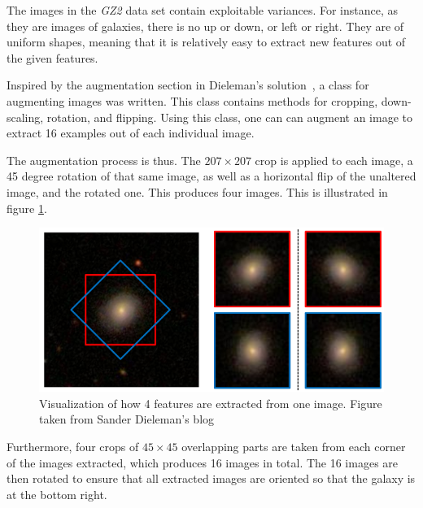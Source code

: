 \documentclass[12pt,a4paper,oneside,oldfontcommands]{memoir}
\begin{document}
\begin{Declaration Of OriginalityOrginality}
The images in the \textit{GZ2} data set contain exploitable variances. For instance, as they are images of galaxies, there is no up or down, or left or right. They are of uniform shapes, meaning that it is relatively easy to extract new features out of the given features. 

Inspired by the augmentation section in Dieleman's solution~\cite{Sanders-GZ}, a class for augmenting images was written. This class contains methods for cropping, down-scaling, rotation, and flipping. Using this class, one can can augment an image to extract 16 examples out of each individual image.

The augmentation process is thus. The \(207\times207\) crop is applied to each image, a 45 degree rotation of that same image, as well as a horizontal flip of the unaltered image, and the rotated one. This produces four images. This is illustrated in figure \ref{fig:sanders-aug-1}. 

\begin{figure}[H]
  \centering
    \includegraphics[width=\linewidth]{images/sanders-aug-1.png}
    \caption{Visualization of how 4 features are extracted from one image. Figure taken from Sander Dieleman's blog~\cite{Sanders-GZ}}
    \label{fig:sanders-aug-1}
\end{figure}

Furthermore, four crops of \(45\times45\) overlapping parts are taken from each corner of the images extracted, which produces 16 images in total. The 16 images are then rotated to ensure that all extracted images are oriented so that the galaxy is at the bottom right.



\end{Declaration Of OriginalityOrginality}
\end{document}
